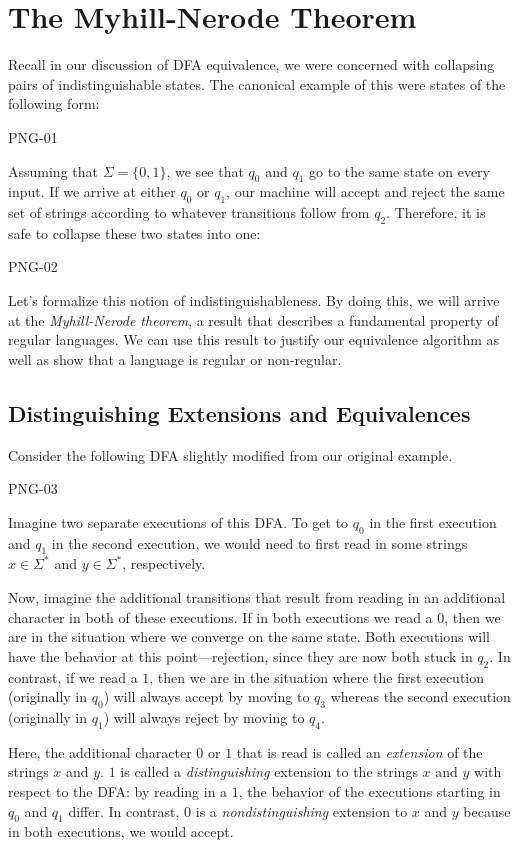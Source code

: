 \documentclass[11pt]{book}
\begin{document}
\section*{The Myhill-Nerode Theorem}

Recall in our discussion of DFA equivalence, we were concerned with collapsing pairs of indistinguishable states.
The canonical example of this were states of the following form:

PNG-01

Assuming that $\Sigma = \{ 0, 1 \}$, we see that $q_0$ and $q_1$ go to the same state on every input.
If we arrive at either $q_0$ or $q_1$, our machine will accept and reject the same set of strings according to whatever transitions follow from $q_2$.
Therefore, it is safe to collapse these two states into one:

PNG-02

Let's formalize this notion of indistinguishableness.
By doing this, we will arrive at the \emph{Myhill-Nerode theorem}, a result that describes a fundamental property of regular languages.
We can use this result to justify our equivalence algorithm as well as show that a language is regular or non-regular.

\subsection*{Distinguishing Extensions and Equivalences}

Consider the following DFA slightly modified from our original example.

PNG-03

Imagine two separate executions of this DFA.
To get to $q_0$ in the first execution and $q_1$ in the second execution, we would need to first read in some strings $x \in \Sigma^*$ and $y \in \Sigma^*$, respectively.

Now, imagine the additional transitions that result from reading in an additional character in both of these executions.
If in both executions we read a $0$, then we are in the situation where we converge on the same state.
Both executions will have the behavior at this point---rejection, since they are now both stuck in $q_2$.
In contrast, if we read a $1$, then we are in the situation where the first execution (originally in $q_0$) will always accept by moving to $q_3$ whereas the second execution (originally in $q_1$) will always reject by moving to $q_4$.

Here, the additional character $0$ or $1$ that is read is called an \emph{extension} of the strings $x$ and $y$.
$1$ is called a \emph{distinguishing} extension to the strings $x$ and $y$ with respect to the DFA: by reading in a $1$, the behavior of the executions starting in $q_0$ and $q_1$ differ.
In contrast, $0$ is a \emph{nondistinguishing} extension to $x$ and $y$ because in both executions, we would accept.
\end{document}
